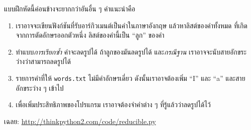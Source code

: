 \begin{exercise}
แบบฝึกหัดนี้ค่อนข้างจะยากกว่าอันอื่น ๆ
คำแนะนำคือ
\begin{enumerate}


\item เราอาจจะเขียนฟังก์ชันที่รับอาร์กิวเมนต์เป็นคำในภาษาอังกฤษ
แล้วหาลิสต์ของคำทั้งหมด ที่เกิดจากการตัดอักษรออกตัวหนึ่ง
ลิสต์ของคำนี้เป็น ``ลูก'' ของคำ


\item ทำแบบ\textit{การเรียกซ้ำ} คำจะลดรูปได้ ถ้าลูกของมันลดรูปได้
และ\textit{กรณีฐาน} เราอาจจะนับสายอักขระว่างว่าสามารถลดรูปได้


\item รายการคำที่ให้ \texttt{words.txt} ไม่มีคำอักษรเดี่ยว
ดังนั้นเราอาจต้องเพิ่ม ``I'' และ ``a'' และสายอักขระว่าง ๆ เข้าไป


\item เพื่อเพิ่มประสิทธิภาพของโปรแกรม เราอาจต้องจำคำต่าง ๆ ที่รู้แล้วว่าลดรูปได้ไว้

\end{enumerate}

เฉลย: \url{http://thinkpython2.com/code/reducible.py}


\end{exercise}
\vspace{0.5cm}








